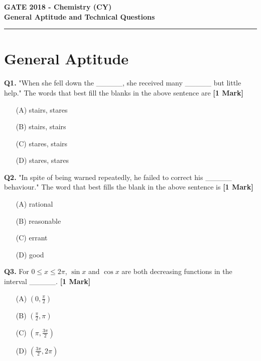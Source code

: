 \documentclass[11pt]{article}
\newcommand{\questiona}[2]{
    \noindent\textbf{Q#2.} #1 \hfill \textbf{[1 Mark]}
}
\begin{document}
\begin{center}
    \Large\textbf{GATE 2018 - Chemistry (CY)} \\
    \large\textbf{General Aptitude and Technical Questions} \\
    \rule{\textwidth}{0.5pt} %
\end{center}

\vspace{0.5cm}

\section*{General Aptitude}

\questiona{"When she fell down the \_\_\_\_\_, she received many \_\_\_\_\_ but little help." The words that best fill the blanks in the above sentence are}{1}
\begin{enumerate}
    \item[(A)] stairs, stares  
    \item[(B)] stairs, stairs  
    \item[(C)] stares, stairs  
    \item[(D)] stares, stares  
\end{enumerate}
\vspace{0.5cm}

\questiona{"In spite of being warned repeatedly, he failed to correct his \_\_\_\_\_ behaviour." The word that best fills the blank in the above sentence is}{2}
\begin{enumerate}
    \item[(A)] rational  
    \item[(B)] reasonable  
    \item[(C)] errant  
    \item[(D)] good  
\end{enumerate}
\vspace{0.5cm}

\questiona{For \(0 \leq x \leq 2\pi\), \(\sin x\) and \(\cos x\) are both decreasing functions in the interval \_\_\_\_\_.}{3}
\begin{enumerate}
    \item[(A)] \(\left(0, \frac{\pi}{2}\right)\)  
    \item[(B)] \(\left(\frac{\pi}{2}, \pi\right)\)  
    \item[(C)] \(\left(\pi, \frac{3\pi}{2}\right)\)  
    \item[(D)] \(\left(\frac{3\pi}{2}, 2\pi\right)\)  
\end{enumerate}
\vspace{0.5cm}
\end{document}
